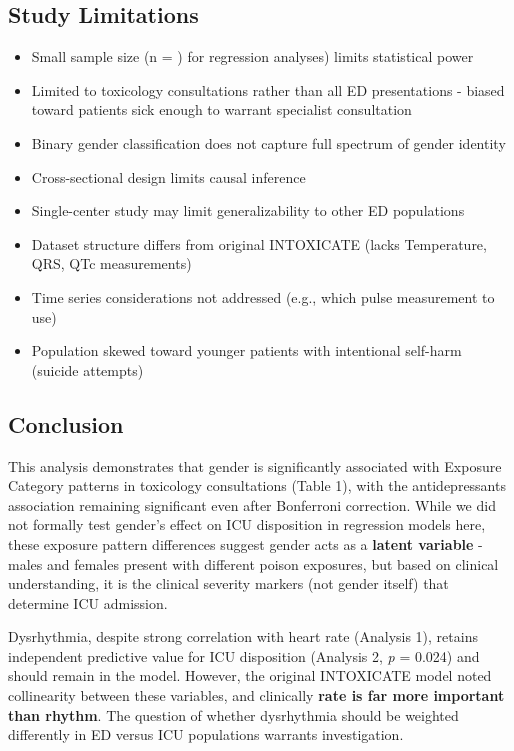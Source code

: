 \documentclass[
]{article}
\providecommand{\tightlist}{%
  \setlength{\itemsep}{0pt}\setlength{\parskip}{0pt}}
\begin{document}
\subsection{Study Limitations}\label{study-limitations}

\begin{itemize}
\tightlist
\item
  Small sample size (n = ) for regression analyses) limits statistical power
\item
  Limited to toxicology consultations rather than all ED presentations - biased toward patients sick enough to warrant specialist consultation
\item
  Binary gender classification does not capture full spectrum of gender identity
\item
  Cross-sectional design limits causal inference
\item
  Single-center study may limit generalizability to other ED populations
\item
  Dataset structure differs from original INTOXICATE (lacks Temperature, QRS, QTc measurements)
\item
  Time series considerations not addressed (e.g., which pulse measurement to use)
\item
  Population skewed toward younger patients with intentional self-harm (suicide attempts)
\end{itemize}

\subsection{Conclusion}\label{conclusion}

This analysis demonstrates that gender is significantly associated with Exposure Category patterns in toxicology consultations (Table 1), with the antidepressants association remaining significant even after Bonferroni correction. While we did not formally test gender's effect on ICU disposition in regression models here, these exposure pattern differences suggest gender acts as a \textbf{latent variable} - males and females present with different poison exposures, but based on clinical understanding, it is the clinical severity markers (not gender itself) that determine ICU admission.

Dysrhythmia, despite strong correlation with heart rate (Analysis 1), retains independent predictive value for ICU disposition (Analysis 2, \emph{p} = 0.024) and should remain in the model. However, the original INTOXICATE model noted collinearity between these variables, and clinically \textbf{rate is far more important than rhythm}. The question of whether dysrhythmia should be weighted differently in ED versus ICU populations warrants investigation.
\end{document}
